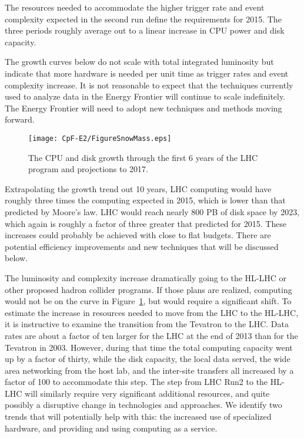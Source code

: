 The resources needed to accommodate
the higher trigger rate and event complexity expected in the second run define
the requirements for
2015.  The three periods roughly average out to a linear increase in
CPU power and disk capacity.

The growth curves below do not scale with total integrated luminosity but
indicate that more hardware is needed per unit time as trigger rates and event
complexity increase. It is not reasonable to expect that the techniques
currently used to analyze data in the Energy Frontier will continue to scale indefinitely.
The Energy Frontier will need to adopt new techniques and methods moving forward.

\begin{figure}[htb]
\begin{center}
\texttt{[image: CpF-E2/FigureSnowMass.eps]}
\caption{The CPU and disk growth through the first 6 years of the LHC program
and projections to 2017.}
\label{fig:growth}
\end{center}
\end{figure}


Extrapolating the growth trend out 10 years,  LHC computing would have
roughly three times the computing expected in 2015, which is lower than that
predicted by Moore's law.  LHC would reach nearly 800 PB of disk 
space by
2023, which again is roughly a factor of three greater that predicted for
2015.   These increases could
probably be achieved with close to flat budgets.   There are potential
efficiency improvements and new techniques that will be discussed below.

The luminosity and complexity increase dramatically
going to the HL-LHC or other proposed hadron collider programs.
If those plans are realized,  computing would not be on
the curve in Figure~\ref{fig:growth}, but would require a significant shift.
To estimate the increase in resources needed to move from the LHC to the
HL-LHC, it is instructive to examine the transition from the Tevatron to the
LHC.  Data rates are about a factor of ten larger for the LHC at the end
of 2013 than for the Tevatron in 2003.
However,  during that time the total computing
capacity went up by a factor of thirty, while the disk capacity, the local data
served, the wide area networking from the host lab, and the inter-site
transfers all increased by a factor of 100 to accommodate this step.  The step
from LHC Run2 to the HL-LHC will similarly require very significant additional
resources, and quite possibly a disruptive change in technologies and
approaches.
We identify two trends that will potentially help with this: the
increased use of specialized hardware, and providing and using computing as a
service.

